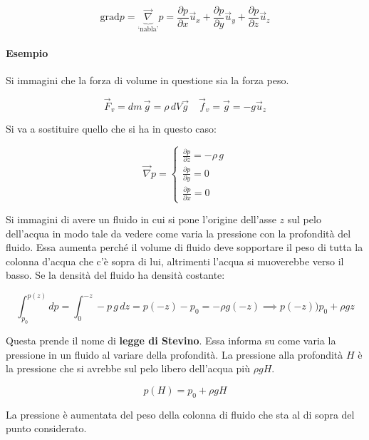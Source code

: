 \[
	\text{grad}p = \underbrace{\vec{\nabla}}_\text{`nabla'} p = \frac{\partial p}{\partial x} \vec{u}_x + \frac{\partial p}{\partial y} \vec{u}_y + \frac{\partial p}{\partial z} \vec{u}_z
\]

\paragraph{Esempio} Si immagini che la forza di volume in questione sia la forza peso.

\[
	\vec{F}_v = dm\,\vec{g} = \rho\,dV\vec{g}  \quad \vec{f}_v = \vec{g} = -g\vec{u}_z
\]

Si va a sostituire quello che si ha in questo caso:

\[
	\vec{\nabla} p = \left\{ \begin{array}{l}
	 	\frac{\partial p}{\partial z} = -\rho\,g \\
	 	\frac{\partial p}{\partial y} = 0 \\
	 	\frac{\partial p}{\partial x} = 0
	\end{array} \right.
\]

Si immagini di avere un fluido in cui si pone l'origine dell'asse $z$ sul pelo dell'acqua in modo tale da vedere come varia la pressione con la profondità del fluido. Essa aumenta perché il volume di fluido deve sopportare il peso di tutta la colonna d'acqua che c'è sopra di lui, altrimenti l'acqua si muoverebbe verso il basso. Se la densità del fluido ha densità costante:

\[
	\int_{p_0 }^{p(z)} dp = \int_0^{-z} -p\,g\,dz= p(-z) - p_0= -\rho g(-z) \implies p(-z) ) p_0 + \rho gz
\]

Questa prende il nome di \textbf{legge di Stevino}. Essa informa su come varia la pressione in un fluido al variare della profondità. La pressione alla profondità $H$ è la pressione che si avrebbe sul pelo libero dell'acqua più $\rho g H$.

\[
	\boxed{p(H) = p_0 + \rho gH}
\]

La pressione è aumentata del peso della colonna di fluido che sta al di sopra del punto considerato.

